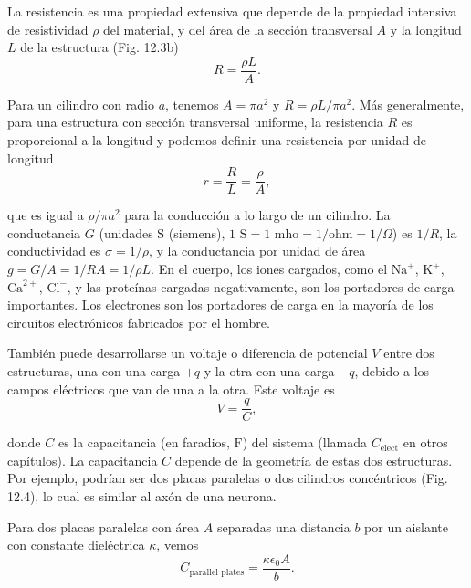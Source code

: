 \documentclass[12pt]{book}
\begin{document}
La resistencia es una propiedad extensiva que depende de la propiedad intensiva de resistividad $\rho$ del material, y del área de la sección transversal $A$ y la longitud $L$ de la estructura (Fig. 12.3b)
\begin{equation}
R = \frac{\rho L}{A}. \label{eq:12.10}
\end{equation}

Para un cilindro con radio $a$, tenemos $A = \pi a^2$ y $R = \rho L/\pi a^2$. Más generalmente, para una estructura con sección transversal uniforme, la resistencia $R$ es proporcional a la longitud y podemos definir una resistencia por unidad de longitud
\begin{equation}
r = \frac{R}{L} = \frac{\rho}{A}, \label{eq:12.11}
\end{equation}

\noindent que es igual a $\rho/\pi a^2$ para la conducción a lo largo de un cilindro. La conductancia $G$ (unidades $\text{S}$ (siemens), $1\text{ S} = 1\text{ mho} = 1/\text{ohm} = 1/\Omega$) es $1/R$, la conductividad es $\sigma = 1/\rho$, y la conductancia por unidad de área $g = G/A = 1/RA = 1/\rho L$. En el cuerpo, los iones cargados, como el $\text{Na}^+$, $\text{K}^+$, $\text{Ca}^{2+}$, $\text{Cl}^-$, y las proteínas cargadas negativamente, son los portadores de carga importantes. Los electrones son los portadores de carga en la mayoría de los circuitos electrónicos fabricados por el hombre.

También puede desarrollarse un voltaje o diferencia de potencial $V$ entre dos estructuras, una con una carga $+q$ y la otra con una carga $-q$, debido a los campos eléctricos que van de una a la otra. Este voltaje es
\begin{equation}
V = \frac{q}{C}, \label{eq:12.12}
\end{equation}

\noindent donde $C$ es la capacitancia (en faradios, $\text{F}$) del sistema (llamada $C_{\text{elect}}$ en otros capítulos). La capacitancia $C$ depende de la geometría de estas dos estructuras. Por ejemplo, podrían ser dos placas paralelas o dos cilindros concéntricos (Fig. 12.4), lo cual es similar al axón de una neurona.

Para dos placas paralelas con área $A$ separadas una distancia $b$ por un aislante con constante dieléctrica $\kappa$, vemos
\begin{equation}
C_{\text{parallel plates}} = \frac{\kappa \epsilon_0 A}{b}. \label{eq:12.13}
\end{equation}
\end{document}
